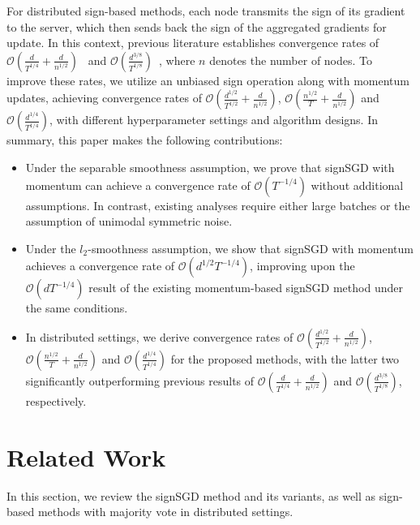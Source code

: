 \documentclass{article}
\begin{document}
For distributed sign-based methods, each node transmits the sign of its gradient to the server, which then sends back the sign of the aggregated gradients for update. 
In this context, previous literature establishes convergence rates of $\mathcal{O}\left( \frac{d}{T^{1/4}} + \frac{d}{n^{1/2}} \right)$~\citep{pmlr-v202-sun23l} and $\mathcal{O}\left(\frac{d^{3/8}}{T^{1/8}}\right)$~\citep{Jin2020StochasticSignSF}, where $n$ denotes the number of nodes. 
To improve these rates, we utilize an unbiased sign operation along with momentum updates, achieving convergence rates of $\mathcal{O}\left( \frac{d^{1/2}}{T^{1/2}} + \frac{d}{n^{1/2}} \right)$, $\mathcal{O}\left( \frac{n^{1/2}}{T} + \frac{d}{n^{1/2}} \right)$ and $\mathcal{O}\left( \frac{d^{1/4}}{T^{1/4}} \right)$, with different hyperparameter settings and algorithm designs. In summary, this paper makes the following contributions:
\begin{itemize}
\item Under the separable smoothness assumption, we prove that signSGD with momentum can achieve a convergence rate of $\mathcal{O}(T^{-1/4})$ without additional assumptions. In contrast, existing analyses require either large batches or the assumption of unimodal symmetric noise.
\item Under the $l_2$-smoothness assumption, we show that signSGD with momentum achieves a convergence rate of $\mathcal{O}(d^{1/2} T^{-1/4})$, improving upon the $\mathcal{O}(d T^{-1/4})$ result of the existing momentum-based signSGD method under the same conditions.
\item In distributed settings, we derive convergence rates of  $\mathcal{O}\left( \frac{d^{1/2}}{T^{1/2}} + \frac{d}{n^{1/2}} \right)$, $\mathcal{O}\left( \frac{n^{1/2}}{T} + \frac{d}{n^{1/2}} \right)$ and $\mathcal{O}\left(  \frac{d^{1/4}}{T^{1/4}} \right)$ for the proposed methods, with the latter two significantly outperforming previous results of $\mathcal{O}\left( \frac{d}{T^{1/4}} + \frac{d}{n^{1/2}} \right)$ and $\mathcal{O}\left( \frac{d^{3/8}}{T^{1/8}} \right)$, respectively.
\end{itemize}
\section{Related Work}
In this section, we review the signSGD method and its variants, as well as sign-based methods with majority vote in distributed settings.
\end{document}
